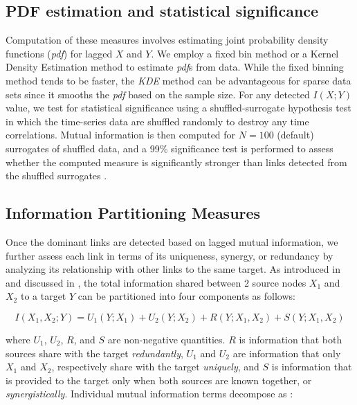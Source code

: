 \documentclass[a4paper]{article}
\begin{document}
\subsection{PDF estimation and statistical significance}
Computation of these measures involves estimating joint probability density functions (\textit{pdf}) for lagged $X$ and $Y$.  We employ a fixed bin method \cite{Ruddell2009_1,Lee2012} or a Kernel Density Estimation method \cite{Lee2012,Silverman1986} to estimate \textit{pdf}s from data.  While the fixed binning method tends to be faster, the \textit{KDE} method can be advantageous for sparse data sets since it smooths the \textit{pdf} based on the sample size.  For any detected $I(X;Y)$ value, we test for statistical significance using a shuffled-surrogate hypothesis test in which the time-series data are shuffled randomly to destroy any time correlations.  Mutual information is then computed for $N=100$ (default) surrogates of shuffled data, and a 99\% significance test is performed to assess whether the computed measure is significantly stronger than links detected from the shuffled surrogates \cite{Goodwell2015, Ruddell2009_1}.

\subsection{Information Partitioning Measures}

Once the dominant links are detected based on lagged mutual information, we further assess each link in terms of its uniqueness, synergy, or redundancy by analyzing its relationship with other links to the same target. As introduced in \cite{Williams2010} and discussed in \cite{Goodwell2015,Barrett2014,Goodwell2016_draft}, the total information shared between 2 source nodes $X_1$ and $X_2$ to a target $Y$ can be partitioned into four components as follows:

\begin{equation}\label{eq:Itot}
I(X_1,X_2;Y) = U_1(Y;X_1)+U_2(Y;X_2)+R(Y;X_1,X_2)+S(Y;X_1,X_2)
\end{equation}

\noindent
where $U_1$, $U_2$, $R$, and $S$ are non-negative quantities.  $R$ is information that both sources share with the target \textit{redundantly}, $U_1$ and $U_2$ are information that only $X_1$ and $X_2$, respectively share with the target \textit{uniquely}, and $S$ is information that is provided to the target only when both sources are known together, or \textit{synergistically}. Individual mutual information terms decompose as \cite{Williams2010}:
\end{document}
